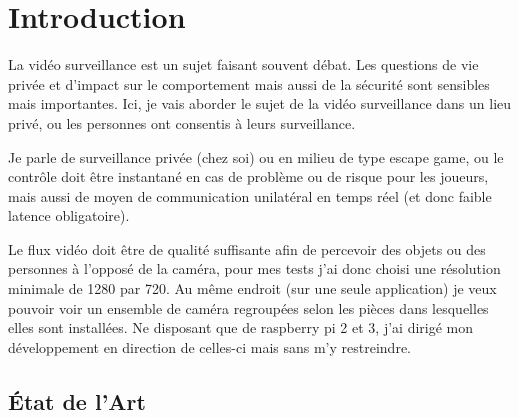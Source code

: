 \documentclass[12pt, a4paper]{report}
\begin{document}
\makeutbmfrontcover{}
\tableofcontents
\chapter{Introduction}
La vidéo surveillance est un sujet faisant souvent débat.\newline
Les questions de vie privée et d'impact sur le comportement mais aussi de la sécurité sont sensibles mais importantes.\newline
Ici, je vais aborder le sujet de la vidéo surveillance dans un lieu privé, ou les personnes ont consentis à leurs surveillance.\newline

Je parle de surveillance privée (chez soi) ou en milieu de type escape game, ou le contrôle doit être instantané en cas de problème ou de risque pour les joueurs, mais aussi de moyen de communication unilatéral en temps réel (et donc faible latence obligatoire).\newline

Le flux vidéo doit être de qualité suffisante afin de percevoir des objets ou des personnes à l'opposé de la caméra, pour mes tests j'ai donc choisi une résolution minimale de 1280 par 720.
Au même endroit (sur une seule application) je veux pouvoir voir un ensemble de caméra regroupées selon les pièces dans lesquelles elles sont installées.\newline
Ne disposant que de raspberry pi 2 et 3, j'ai dirigé mon développement en direction de celles-ci mais sans m'y restreindre.

\section{État de l'Art}
\end{document}
